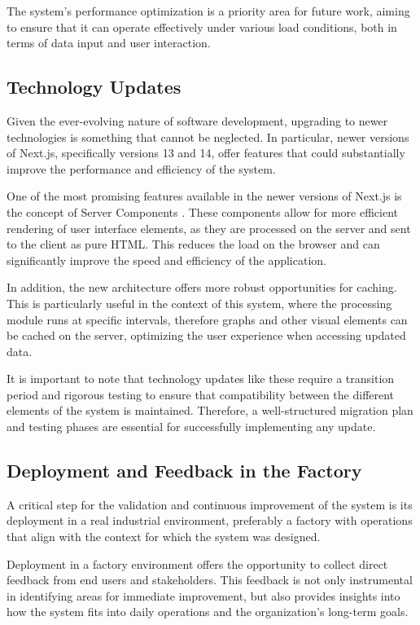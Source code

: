 The system's performance optimization is a priority area for future work, aiming to ensure that it can operate effectively under various load conditions, both in terms of data input and user interaction.

\subsection{Technology Updates}
Given the ever-evolving nature of software development, upgrading to newer technologies is something that cannot be neglected. In particular, newer versions of Next.js, specifically versions 13 and 14, offer features that could substantially improve the performance and efficiency of the system.

One of the most promising features available in the newer versions of Next.js is the concept of Server Components \cite{nextjsServerComponents}. These components allow for more efficient rendering of user interface elements, as they are processed on the server and sent to the client as pure HTML. This reduces the load on the browser and can significantly improve the speed and efficiency of the application.

In addition, the new architecture offers more robust opportunities for caching. This is particularly useful in the context of this system, where the processing module runs at specific intervals, therefore graphs and other visual elements can be cached on the server, optimizing the user experience when accessing updated data.

It is important to note that technology updates like these require a transition period and rigorous testing to ensure that compatibility between the different elements of the system is maintained. Therefore, a well-structured migration plan and testing phases are essential for successfully implementing any update.

\subsection{Deployment and Feedback in the Factory}

A critical step for the validation and continuous improvement of the system is its deployment in a real industrial environment, preferably a factory with operations that align with the context for which the system was designed.

Deployment in a factory environment offers the opportunity to collect direct feedback from end users and stakeholders. This feedback is not only instrumental in identifying areas for immediate improvement, but also provides insights into how the system fits into daily operations and the organization's long-term goals.

